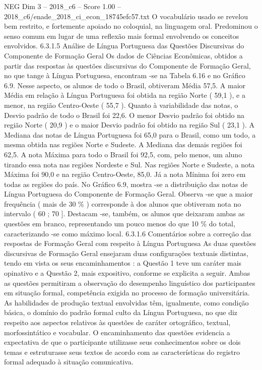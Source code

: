 \begin{textsample}{NEG Dim 3 – 2018\_c6 – Score 1.00 – 2018\_c6/enade\_2018\_ci\_econ\_18745efc57.txt}
O vocabulário usado se revelou bem restrito, e fortemente apoiado no coloquial, na linguagem oral.
Predominou o senso comum em lugar de uma reflexão mais formal envolvendo os conceitos envolvidos. 6.3.1.5 Análise de Língua Portuguesa das Questões Discursivas do Componente de Formação Geral Os dados de Ciências Econômicas, obtidos a partir das respostas às questões discursivas do Componente de Formação Geral, no que tange à Língua Portuguesa, encontram -se na Tabela 6.16 e no Gráfico 6.9.
Nesse aspecto, os alunos de todo o Brasil, obtiveram Média 57,5.
A maior Média em relação à Língua Portuguesa foi obtida na região Norte ( 59,1 ), e a menor, na região Centro-Oeste ( 55,7 ).
Quanto à variabilidade das notas, o Desvio padrão de todo o Brasil foi 22,6.
O menor Desvio padrão foi obtido na região Norte ( 20,9 ) e o maior Desvio padrão foi obtido na região Sul ( 23,1 ).
A Mediana das notas de Língua Portuguesa foi 65,0 para o Brasil, como um todo, a mesma obtida nas regiões Norte e Sudeste.
A Mediana das demais regiões foi 62,5.
A nota Máxima para todo o Brasil foi 92,5, com, pelo menos, um aluno tirando essa nota nas regiões Nordeste e Sul.
Nas regiões Norte e Sudeste, a nota Máxima foi 90,0 e na região Centro-Oeste, 85,0.
Já a nota Mínima foi zero em todas as regiões do país.
No Gráfico 6.9, mostra -se a distribuição das notas de Língua Portuguesa do Componente de Formação Geral.
Observa -se que a maior frequência ( mais de 30 \% ) corresponde à dos alunos que obtiveram nota no intervalo ( 60 ; 70 ].
Destacam -se, também, os alunos que deixaram ambas as questões em branco, representando um pouco menos do que 10 \% do total, caracterizando -se como máximo local. 6.3.1.6 Comentários sobre a correção das respostas de Formação Geral com respeito à Língua Portuguesa As duas questões discursivas de Formação Geral ensejaram duas configurações textuais distintas, tendo em vista os seus encaminhamentos : a Questão 1 teve um caráter mais opinativo e a Questão 2, mais expositivo, conforme se explicita a seguir.
Ambas as questões permitiram a observação do desempenho linguístico dos participantes em situação formal, competência exigida no processo de formação universitária.
As habilidades de produção textual envolvidas têm, igualmente, como condição básica, o domínio do padrão formal culto da Língua Portuguesa, no que diz respeito aos aspectos relativos às questões de caráter ortográfico, textual, morfossintático e vocabular.
O encaminhamento das questões evidencia a expectativa de que o participante utilizasse seus conhecimentos sobre os dois temas e estruturasse seus textos de acordo com as características do registro formal adequado à situação comunicativa.

\end{textsample}
